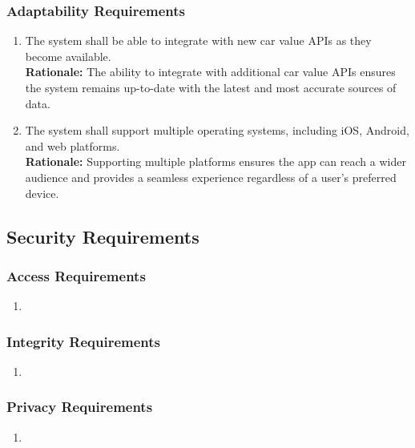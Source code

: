 \documentclass[]{article}
\begin{document}
\subsubsection{Adaptability Requirements}
\label{ssub:adaptability_requirements}
\begin{enumerate}[{MS-A}1. ]
	\item The system shall be able to integrate with new car value APIs as they become available.\\
	\textbf{Rationale:} The ability to integrate with additional car value APIs ensures the system remains up-to-date with the latest and most accurate sources of data.
	\item The system shall support multiple operating systems, including iOS, Android, and web platforms.\\
	\textbf{Rationale:} Supporting multiple platforms ensures the app can reach a wider audience and provides a seamless experience regardless of a user's preferred device.
\end{enumerate}


\subsection{Security Requirements}
\label{sub:security_requirements}

\subsubsection{Access Requirements}
\label{ssub:access_requirements}
\begin{enumerate}[{SR-AC}1. ]
	\item 
\end{enumerate}

\subsubsection{Integrity Requirements}
\label{ssub:integrity_requirements}
\begin{enumerate}[{SR-INT}1. ]
	\item 
\end{enumerate}

\subsubsection{Privacy Requirements}
\label{ssub:privacy_requirements}
\begin{enumerate}[{SR-P}1. ]
	\item 
\end{enumerate}
\end{document}
